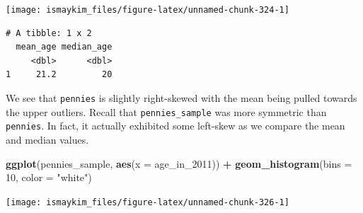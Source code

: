\documentclass[12pt,]{krantz}
\makeatletter
\newenvironment{Shaded}{\begin{snugshade}}{\end{snugshade}}
\newcommand{\KeywordTok}[1]{\textcolor[rgb]{0.27,0.27,0.27}{\textbf{#1}}}
\newcommand{\DataTypeTok}[1]{\textcolor[rgb]{0.27,0.27,0.27}{#1}}
\newcommand{\DecValTok}[1]{\textcolor[rgb]{0.06,0.06,0.06}{#1}}
\newcommand{\StringTok}[1]{\textcolor[rgb]{0.5,0.5,0.5}{#1}}
\newcommand{\OperatorTok}[1]{\textcolor[rgb]{0.43,0.43,0.43}{\textbf{#1}}}
\newcommand{\NormalTok}[1]{#1}
\newenvironment{kframe}{%
\medskip{}
\setlength{\fboxsep}{.8em}
 \def\at@end@of@kframe{}%
 \ifinner\ifhmode%
  \def\at@end@of@kframe{\end{minipage}}%
  \begin{minipage}{\columnwidth}%
 \fi\fi%
 \def\FrameCommand##1{\hskip\@totalleftmargin \hskip-\fboxsep
 \colorbox{shadecolor}{##1}\hskip-\fboxsep
     \hskip-\linewidth \hskip-\@totalleftmargin \hskip\columnwidth}%
 \MakeFramed {\advance\hsize-\width
   \@totalleftmargin\z@ \linewidth\hsize
   \@setminipage}}%
 {\par\unskip\endMakeFramed%
 \at@end@of@kframe}
\renewenvironment{Shaded}{\begin{kframe}}{\end{kframe}}
\theoremstyle{definition}
\theoremstyle{definition}
\theoremstyle{definition}
\theoremstyle{remark}
\makeatother
\begin{document}
\begin{center}\texttt{[image: ismaykim\_files/figure-latex/unnamed-chunk-324-1]} \end{center}

\begin{Shaded}
\end{Shaded}

\begin{verbatim}
# A tibble: 1 x 2
  mean_age median_age
     <dbl>      <dbl>
1     21.2         20
\end{verbatim}

We see that \texttt{pennies} is slightly right-skewed with the mean
being pulled towards the upper outliers. Recall that
\texttt{pennies\_sample} was more symmetric than \texttt{pennies}. In
fact, it actually exhibited some left-skew as we compare the mean and
median values.

\begin{Shaded}
\begin{Highlighting}[]
\KeywordTok{ggplot}\NormalTok{(pennies_sample, }\KeywordTok{aes}\NormalTok{(}\DataTypeTok{x =}\NormalTok{ age_in_}\DecValTok{2011}\NormalTok{)) }\OperatorTok{+}
\StringTok{  }\KeywordTok{geom_histogram}\NormalTok{(}\DataTypeTok{bins =} \DecValTok{10}\NormalTok{, }\DataTypeTok{color =} \StringTok{"white"}\NormalTok{)}
\end{Highlighting}
\end{Shaded}

\begin{center}\texttt{[image: ismaykim\_files/figure-latex/unnamed-chunk-326-1]} \end{center}

\begin{Shaded}
\end{Shaded}
\end{document}
